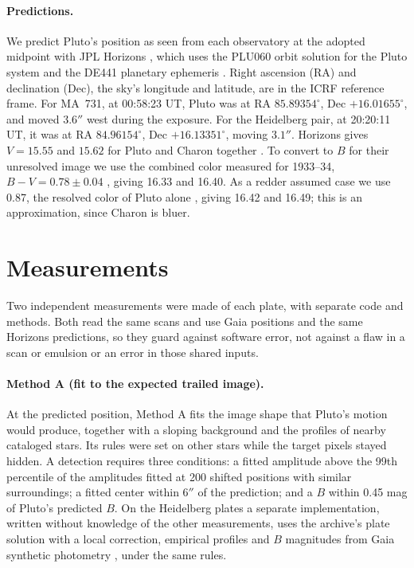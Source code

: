 \documentclass[11pt]{article}
\begin{document}
\paragraph{Predictions.}
We predict Pluto's position as seen from each observatory at the adopted midpoint with JPL Horizons \cite{Giorgini1996}, which uses the PLU060 orbit solution for the Pluto system \cite{Brozovic2024} and the DE441 planetary ephemeris \cite{Park2021}. Right ascension (RA) and declination (Dec), the sky's longitude and latitude, are in the ICRF reference frame. For MA~731, at 00:58:23 UT, Pluto was at RA $85.89354^\circ$, Dec $+16.01655^\circ$, and moved $3.6''$ west during the exposure. For the Heidelberg pair, at 20:20:11 UT, it was at RA $84.96154^\circ$, Dec $+16.13351^\circ$, moving $3.1''$. Horizons gives $V=15.55$ and $15.62$ for Pluto and Charon together \cite{HorizonsManual}. To convert to $B$ for their unresolved image we use the combined color measured for 1933--34, $B-V=0.78\pm0.04$ \cite{Schaefer2008}, giving 16.33 and 16.40. As a redder assumed case we use 0.87, the resolved color of Pluto alone \cite{Buie1997,Buie2006}, giving 16.42 and 16.49; this is an approximation, since Charon is bluer.

\section{Measurements}
\label{sec:measure}

Two independent measurements were made of each plate, with separate code and methods. Both read the same scans and use Gaia positions and the same Horizons predictions, so they guard against software error, not against a flaw in a scan or emulsion or an error in those shared inputs.

\paragraph{Method A (fit to the expected trailed image).}
At the predicted position, Method A fits the image shape that Pluto's motion would produce, together with a sloping background and the profiles of nearby cataloged stars. Its rules were set on other stars while the target pixels stayed hidden. A detection requires three conditions: a fitted amplitude above the 99th percentile of the amplitudes fitted at 200 shifted positions with similar surroundings; a fitted center within $6''$ of the prediction; and a $B$ within 0.45 mag of Pluto's predicted $B$. On the Heidelberg plates a separate implementation, written without knowledge of the other measurements, uses the archive's plate solution with a local correction, empirical profiles and $B$ magnitudes from Gaia synthetic photometry \cite{Montegriffo2023}, under the same rules.
\end{document}
